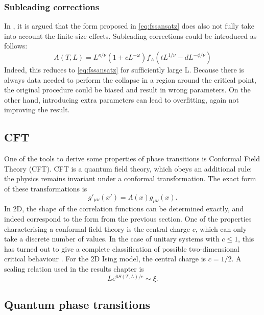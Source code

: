 \subsubsection{Subleading corrections}
In \cite{Beach2005}, it is argued that the form proposed in \cref{eq:fssansatz} does also not fully take into account the finite-size effects. Subleading corrections could be introduced as follows:
\begin{equation}\label{ea:subleadparam}
    A(T,L) = L^{\kappa / \nu} ( 1+c L^{-\omega} ) f_A( t L ^{1/ \nu} -d L^{-\phi/\nu} )
\end{equation}
Indeed, this reduces to \cref{eq:fssansatz} for sufficiently large L. Because there is always data needed to perform the collapse in a region around the critical point, the original procedure could be biased and result in wrong parameters. On the other hand, introducing extra parameters can lead to overfitting, again not improving the result.

\subsection{CFT}\label{crit:cft}

One of the tools to derive some properties of phase transitions is Conformal Field Theory (CFT). CFT is a quantum field theory, which obeys an additional rule: the physics remains invariant under a conformal transformation. The exact form of these transformations is
\begin{equation}
    g'_{\mu \nu}(x') = \Lambda(x) g_{\mu \nu}(x) .
\end{equation}
In 2D, the shape of the correlation functions can be determined exactly, and indeed correspond to the form from the previous section. One of the properties characterising a conformal field theory is the central charge $c$, which can only take a discrete number of values.  In the case of unitary systems with $c \leq  1$, this has  turned out to give a complete classification of possible two-dimensional critical behaviour \cite{Ginsparg1988}. For the 2D Ising model, the central charge is $c=1/2$. A scaling relation used in the results chapter is \cite{Calabrese}
\begin{equation}
    L e^{  6 S( T,L ) /c }  \sim   \xi .
\end{equation}

\subsection{Quantum phase transitions}

